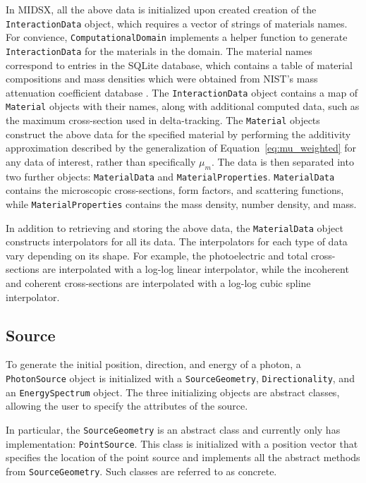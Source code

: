 \par In MIDSX, all the above data is initialized upon created creation of the \texttt{InteractionData} object, which requires a vector of strings of materials names. For convience, \newline
\texttt{ComputationalDomain} implements a helper function to generate \texttt{InteractionData} for the materials in the domain. The material names correspond to entries in the SQLite database, which contains a table of material compositions and mass densities which were obtained from NIST's mass attenuation coefficient database \cite{hubbell_x-ray_2004}. The \texttt{InteractionData} object contains a map of \texttt{Material} objects with their names, along with additional computed data, such as the maximum cross-section used in delta-tracking. The \texttt{Material} objects construct the above data for the specified material by performing the additivity approximation described by the generalization of Equation~\ref{eq:mu_weighted} for any data of interest, rather than specifically $\mu_m$. The data is then separated into two further objects: \texttt{MaterialData} and \texttt{MaterialProperties}. \texttt{MaterialData} contains the microscopic cross-sections, form factors, and scattering functions, while \texttt{MaterialProperties} contains the mass density, number density, and mass.
\par In addition to retrieving and storing the above data, the \texttt{MaterialData} object constructs interpolators for all its data. The interpolators for each type of data vary depending on its shape. For example, the photoelectric and total cross-sections are interpolated with a log-log linear interpolator, while the incoherent and coherent cross-sections are interpolated with a log-log cubic spline interpolator.

\subsection{Source}
\par To generate the initial position, direction, and energy of a photon, a \texttt{PhotonSource} object is initialized with a \texttt{SourceGeometry}, \texttt{Directionality}, and an \texttt{EnergySpectrum} object. The three initializing objects are abstract classes, allowing the user to specify the attributes of the source. 

\par In particular, the \texttt{SourceGeometry} is an abstract class and currently only has implementation: \texttt{PointSource}. This class is initialized with a position vector that specifies the location of the point source and implements all the abstract methods from \texttt{SourceGeometry}. Such classes are referred to as concrete.

